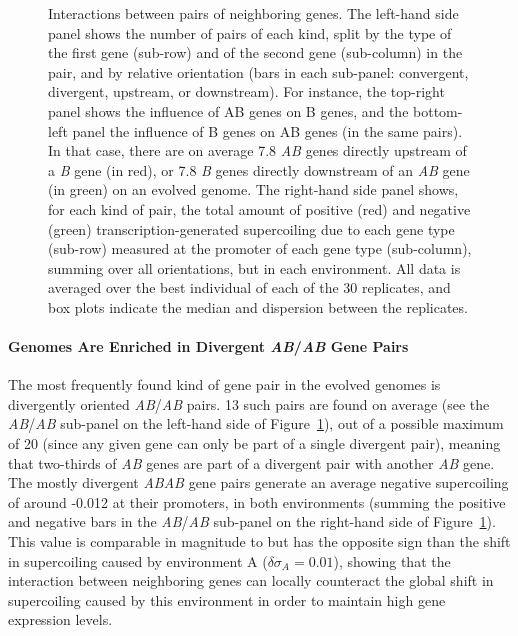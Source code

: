 \begin{figure}[H]
	\centering
	\begin{elasticrow}[width=\linewidth, sep=1em]
	\end{elasticrow}
  \caption[Number of gene pairs and supercoiling effect per type of gene pair]{Interactions between pairs of neighboring genes.
  The left-hand side panel shows the number of pairs of each kind, split by the type of the first gene (sub-row) and of the second gene (sub-column) in the pair, and by relative orientation (bars in each sub-panel: convergent, divergent, upstream, or downstream).
  For instance, the top-right panel shows the influence of AB genes on B genes, and the bottom-left panel the influence of B genes on AB genes (in the same pairs).
  In that case, there are on average 7.8 \emph{AB} genes directly upstream of a \emph{B} gene (in red), or 7.8 \emph{B} genes directly downstream of an \emph{AB} gene (in green) on an evolved genome.
  The right-hand side panel shows, for each kind of pair, the total amount of positive (red) and negative (green) transcription-generated supercoiling due to each gene type (sub-row) measured at the promoter of each gene type (sub-column), summing over all orientations, but in each environment.
  All data is averaged over the best individual of each of the 30 replicates, and box plots indicate the median and dispersion between the replicates.}
  \label{fig:ploscb:pair_results}
\end{figure}

\paragraph{Genomes Are Enriched in Divergent \emph{AB}/\emph{AB} Gene Pairs}
The most frequently found kind of gene pair in the evolved genomes is divergently oriented \emph{AB}/\emph{AB} pairs.
13 such pairs are found on average (see the \emph{AB}/\emph{AB} sub-panel on the left-hand side of Figure~\ref{fig:ploscb:pair_results}), out of a possible maximum of 20 (since any given gene can only be part of a single divergent pair), meaning that two-thirds of \emph{AB} genes are part of a divergent pair with another \emph{AB} gene.
The mostly divergent \emph{AB}\emph{AB} gene pairs generate an average negative supercoiling of around -0.012 at their promoters, in both environments (summing the positive and negative bars in the \emph{AB}/\emph{AB} sub-panel on the right-hand side of Figure~\ref{fig:ploscb:pair_results}).
This value is comparable in magnitude to but has the opposite sign than the shift in supercoiling caused by environment A ($\delta\sigma_A = 0.01$), showing that the interaction between neighboring genes can locally counteract the global shift in supercoiling caused by this environment in order to maintain high gene expression levels.

